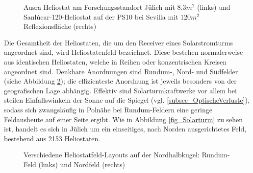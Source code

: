 \begin{figure}[h!]
    \centering
    \setlength{\fboxsep}{1pt}
    \setlength{\fboxrule}{1pt}
\caption[Ausra Heliostat am Forschungsstandort Jülich mit $8.3m^2$  und Sanlúcar-120-Heliostat auf der PS10 bei Sevilla mit $120m^2$ Reflexionsfläche]{Ausra Heliostat am Forschungsstandort Jülich mit $8.3m^2$  (links) und Sanlúcar-120-Heliostat auf der PS10 bei Sevilla mit $120m^2$ Reflexionsfläche (rechts) \cite[S. 13]{DissBelhomme}}
    \label{fig_DarstellungHeliostat}
\end{figure}

Die Gesamtheit der Heliostaten, die um den Receiver eines Solarstromturms angeordnet sind, wird Heliostatenfeld bezeichnet.
Diese bestehen normalerweise aus identischen Heliostaten, welche in Reihen oder konzentrischen Kreisen angeordnet sind.
Denkbare Anordnungen sind Rundum-, Nord- und Südfelder (siehe Abbildung \ref{fig_AnordnungHeliostatfeld}); die effizienteste Anordnung ist jeweils besonders von der geografischen Lage abhängig.
Effektiv sind Solarturmkraftwerke vor allem bei steilen Einfallswinkeln der Sonne auf die Spiegel (vgl.
\ref{subsec_OptischeVerluste}), sodass sich zwangsläufig in Polnähe bei Rundum-Feldern eine geringe Feldausbeute auf einer Seite ergibt.
Wie in Abbildung \ref{fig_Solarturm} zu sehen ist, handelt es sich in Jülich um ein einseitiges, nach Norden ausgerichtetes Feld, bestehend aus 2153 Heliostaten.

\begin{figure}[h!]
    \centering
    \setlength{\fboxsep}{1pt}
    \setlength{\fboxrule}{1pt}
\caption[Verschiedene Heliostatfeld-Layouts auf der Nordhalbkugel: Rundum-Feld und Nordfeld]{Verschiedene Heliostatfeld-Layouts auf der Nordhalbkugel: Rundum-Feld (links) und Nordfeld (rechts) \cite[S. 14]{DissBelhomme}}
    \label{fig_AnordnungHeliostatfeld}
\end{figure}


